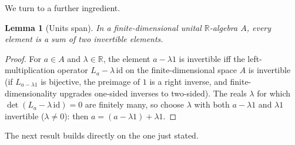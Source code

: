\documentclass[11pt]{article}
\newtheorem{lemma}[theorem]{Lemma}
\theoremstyle{definition}
\theoremstyle{plain}
\providecommand{\R}{}\renewcommand{\R}{\mathbb{R}}
\begin{document}
We turn to a further ingredient.

\begin{lemma}[Units span]\label{c:transport.units-span}
In a finite-dimensional unital $\R$-algebra $A$, every element is a sum of two invertible elements.
\end{lemma}
\begin{proof}
For $a \in A$ and $\lambda \in \R$, the element $a - \lambda 1$ is invertible iff the left-multiplication operator $L_a - \lambda\, \mathrm{id}$ on the finite-dimensional space $A$ is invertible (if $L_{a - \lambda 1}$ is bijective, the preimage of $1$ is a right inverse, and finite-dimensionality upgrades one-sided inverses to two-sided). The reals $\lambda$ for which $\det(L_a - \lambda\,\mathrm{id}) = 0$ are finitely many, so choose $\lambda$ with both $a - \lambda 1$ and $\lambda 1$ invertible ($\lambda \neq 0$): then $a = (a - \lambda 1) + \lambda 1$.

\end{proof}

The next result builds directly on the one just stated.
\end{document}
